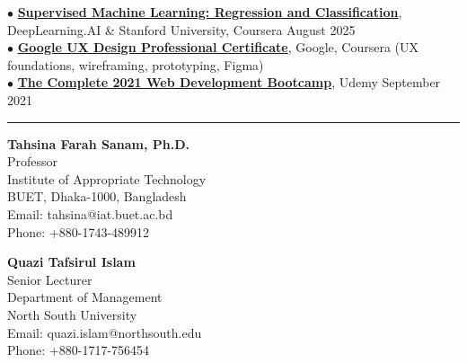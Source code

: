 \documentclass[11pt,a4paper]{article}
\renewcommand{\section}[1]{%
    \par\vspace{6pt}%
    \pagebreak[0]%
    \noindent{\large\bfseries\scshape #1}%
    \vspace{2pt}%
    \hrule%
    \vspace{6pt}%
    \nopagebreak[4]%
}
\begin{document}
\noindent$\bullet$ \href{https://coursera.org/verify/6I4AZ2IH4ANS}{\textbf{Supervised Machine Learning: Regression and Classification}}, DeepLearning.AI \& Stanford University, Coursera \hfill August 2025\\
$\bullet$ \href{https://lnkd.in/dDCmw4MP}{\textbf{Google UX Design Professional Certificate}}, Google, Coursera (UX foundations, wireframing, prototyping, Figma)\\
$\bullet$ \href{https://www.udemy.com/certificate/UC-31cfe125-f6cb-405c-9432-e008b56b7f0f/}{\textbf{The Complete 2021 Web Development Bootcamp}}, Udemy \hfill September 2021

\section{References}

\noindent\small\begin{minipage}[t]{0.48\textwidth}
\textbf{Tahsina Farah Sanam, Ph.D.}\\
Professor\\
Institute of Appropriate Technology\\
BUET, Dhaka-1000, Bangladesh\\
Email: tahsina@iat.buet.ac.bd\\
Phone: +880-1743-489912
\end{minipage}
\hfill
\begin{minipage}[t]{0.48\textwidth}
\textbf{Quazi Tafsirul Islam}\\
Senior Lecturer\\
Department of Management\\
North South University\\
Email: quazi.islam@northsouth.edu\\
Phone: +880-1717-756454
\end{minipage}
\end{document}
